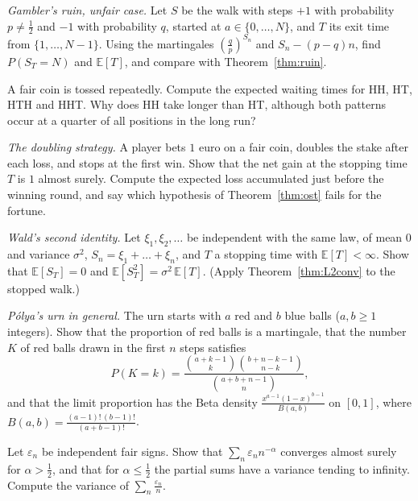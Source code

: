 \begin{exercise}[$\star$]\label{ex:ruinasym}
\emph{Gambler's ruin, unfair case.} Let $S$ be the walk with steps $+1$ with probability $p\ne\frac12$ and $-1$ with probability $q$, started at $a\in\{0,\dots,N\}$, and $T$ its
exit time from $\{1,\dots,N-1\}$. Using the martingales $(\frac qp)^{S_n}$ and $S_n-(p-q)n$, find $P(S_T=N)$ and $\mathbb E[T]$, and compare with Theorem~\ref{thm:ruin}.
\end{exercise}

\begin{exercise}[$\star$]\label{ex:patterns}
A fair coin is tossed repeatedly. Compute the expected waiting times for HH, HT, HTH and HHT. Why does HH take longer than HT,
although both patterns occur at a quarter of all positions in the long run?
\end{exercise}

\begin{exercise}[$\star$]\label{ex:doubling}
\emph{The doubling strategy.} A player bets $1$ euro on a fair coin, doubles the stake after each loss, and stops at the first win.
Show that the net gain at the stopping time $T$ is $1$ almost surely. Compute the expected loss accumulated just before the
winning round, and say which hypothesis of Theorem~\ref{thm:ost} fails for the fortune.
\end{exercise}

\begin{exercise}[$\star\star$]\label{ex:wald2}
\emph{Wald's second identity.} Let $\xi_1,\xi_2,\ldots$ be independent with the same law, of mean $0$ and variance $\sigma^2$, $S_n=\xi_1+\dots+\xi_n$, and $T$ a stopping time
with $\mathbb E[T]<\infty$. Show that $\mathbb E[S_T]=0$ and $\mathbb E[S_T^2]=\sigma^2\,\mathbb E[T]$. (Apply Theorem~\ref{thm:L2conv} to the stopped walk.)
\end{exercise}

\begin{exercise}[$\star\star$]\label{ex:polyabeta}
\emph{P\'olya's urn in general.} The urn starts with $a$ red and $b$ blue balls ($a,b\ge1$ integers). Show that the proportion of red balls is a
martingale, that the number $K$ of red balls drawn in the first $n$ steps satisfies
\[
P(K=k)=\frac{\binom{a+k-1}k\binom{b+n-k-1}{n-k}}{\binom{a+b+n-1}n},
\]
and that the limit proportion has the Beta density $\frac{x^{a-1}(1-x)^{b-1}}{B(a,b)}$ on $[0,1]$, where $B(a,b)=\frac{(a-1)!\,(b-1)!}{(a+b-1)!}$.
\end{exercise}

\begin{exercise}[$\star$]\label{ex:signs}
Let $\varepsilon_n$ be independent fair signs. Show that $\sum_n\varepsilon_nn^{-\alpha}$ converges almost surely for $\alpha>\frac12$, and that for $\alpha\le\frac12$ the partial sums have a
variance tending to infinity. Compute the variance of $\sum_n\frac{\varepsilon_n}n$.
\end{exercise}

